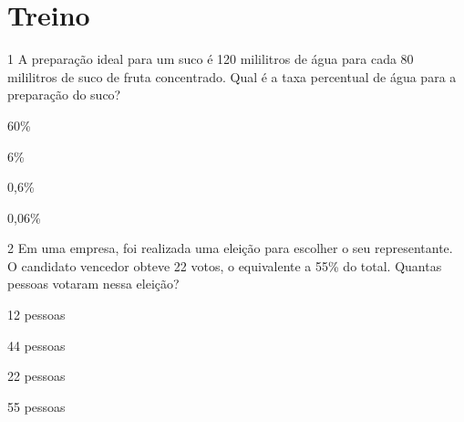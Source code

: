 \section{Treino}

\num{1} A preparação ideal para um suco é 120 mililitros de água para cada 80
mililitros de suco de fruta concentrado. Qual é a taxa percentual de
água para a preparação do suco?

\begin{escolha}
\item 60\%
\item 6\%
\item 0,6\%
\item 0,06\%
\end{escolha}












\num{2} Em uma empresa, foi realizada uma eleição para escolher o seu
representante. O candidato vencedor obteve 22 votos, o equivalente a
55\% do total. Quantas pessoas votaram nessa eleição?

\begin{escolha}
\item 12 pessoas
\item 44 pessoas
\item 22 pessoas
\item 55 pessoas
\end{escolha}

